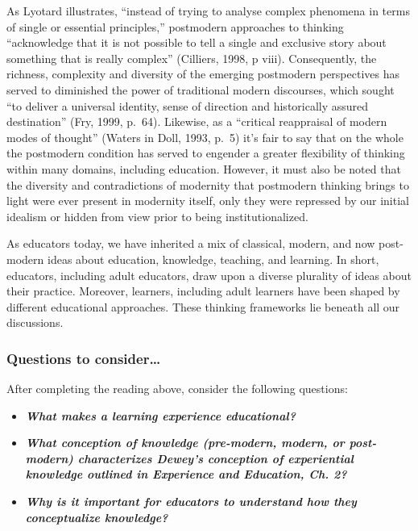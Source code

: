 \documentclass[
]{book}
\providecommand{\tightlist}{%
  \setlength{\itemsep}{0pt}\setlength{\parskip}{0pt}}
\begin{document}
As Lyotard illustrates, ``instead of trying to analyse complex phenomena in terms of single or essential principles,'' postmodern approaches to thinking ``acknowledge that it is not possible to tell a single and exclusive story about something that is really complex'' (Cilliers, 1998, p viii). Consequently, the richness, complexity and diversity of the emerging postmodern perspectives has served to diminished the power of traditional modern discourses, which sought ``to deliver a universal identity, sense of direction and historically assured destination'' (Fry, 1999, p.~64). Likewise, as a ``critical reappraisal of modern modes of thought'' (Waters in Doll, 1993, p.~5) it's fair to say that on the whole the postmodern condition has served to engender a greater flexibility of thinking within many domains, including education. However, it must also be noted that the diversity and contradictions of modernity that postmodern thinking brings to light were ever present in modernity itself, only they were repressed by our initial idealism or hidden from view prior to being institutionalized.

As educators today, we have inherited a mix of classical, modern, and now post-modern ideas about education, knowledge, teaching, and learning. In short, educators, including adult educators, draw upon a diverse plurality of ideas about their practice. Moreover, learners, including adult learners have been shaped by different educational approaches. These thinking frameworks lie beneath all our discussions.

\begin{reflect}
\hypertarget{questions-to-consider-1}{%
\subsubsection*{Questions to consider\ldots{}}\label{questions-to-consider-1}}

After completing the reading above, consider the following questions:

\begin{itemize}
\tightlist
\item
  \textbf{\emph{What makes a learning experience educational?}}\\
\item
  \textbf{\emph{What conception of knowledge (pre-modern, modern, or post-modern) characterizes Dewey's conception of experiential knowledge outlined in Experience and Education, Ch. 2?}}\\
\item
  \textbf{\emph{Why is it important for educators to understand how they conceptualize knowledge?}}
\end{itemize}
\end{reflect}
\end{document}
